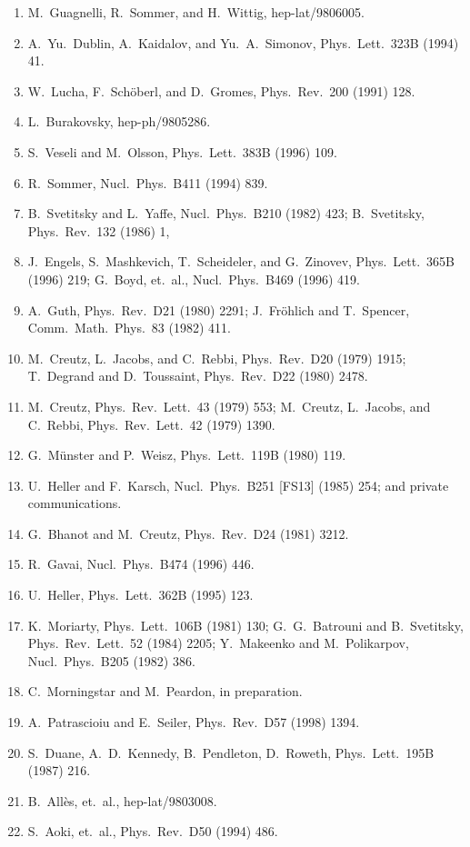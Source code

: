 \begin{enumerate}
\item M.~Guagnelli, R.~Sommer, and H.~Wittig, hep-lat/9806005.
\item A.~Yu.~Dublin, A.~Kaidalov, and Yu.~A.~Simonov, Phys.\ Lett.\ 323B (1994) 41.
\item W.~Lucha, F.~Sch\"oberl, and D.~Gromes, Phys.\ Rev.\ 200 (1991) 128.
\item L.~Burakovsky, hep-ph/9805286.
\item S.~Veseli and M.~Olsson, Phys.\ Lett.\ 383B (1996) 109.
\item R.~Sommer, Nucl.\ Phys.\ B411 (1994) 839.
\item B.~Svetitsky and L.~Yaffe, Nucl.\ Phys.\ B210 (1982) 423; B.~Svetitsky, Phys.\ Rev.\ 132 (1986) 1,
\item J.~Engels, S.~Mashkevich, T.~Scheideler, and G.~Zinovev, Phys.\ Lett.\ 365B (1996) 219; G.~Boyd, et.\ al., Nucl.\ Phys.\ B469 (1996) 419.
\item A.~Guth, Phys.\ Rev.\ D21 (1980) 2291; J.~Fr\"ohlich and T.~Spencer, Comm.\ Math.\ Phys.\ 83 (1982) 411.
\item M.~Creutz, L.~Jacobs, and C.~Rebbi, Phys.\ Rev.\ D20 (1979) 1915; T.~Degrand and D.~Toussaint, Phys.\ Rev.\ D22 (1980) 2478.
\item M.~Creutz, Phys.\ Rev.\ Lett.\ 43 (1979) 553; M.~Creutz, L.~Jacobs, and C.~Rebbi, Phys.\ Rev.\ Lett.\ 42 (1979) 1390.
\item G.~M\"unster and P.~Weisz, Phys.\ Lett.\ 119B (1980) 119.
\item U.~Heller and F.~Karsch, Nucl.\ Phys.\ B251 [FS13] (1985) 254; and private communications.
\item G.~Bhanot and M.~Creutz, Phys.\ Rev.\ D24 (1981) 3212.
\item R.~Gavai, Nucl.\ Phys.\ B474 (1996) 446.
\item U.~Heller, Phys.\ Lett.\ 362B (1995) 123.
\item K.~Moriarty, Phys.\ Lett.\ 106B (1981) 130; G.~G.~Batrouni and B.~Svetitsky, Phys.\ Rev.\ Lett.\ 52 (1984) 2205; Y.~Makeenko and M.~Polikarpov, Nucl.\ Phys.\ B205 (1982) 386.
\item C.~Morningstar and M.~Peardon, in preparation.
\item A.~Patrascioiu and E.~Seiler, Phys.\ Rev.\ D57 (1998) 1394.
\item S.~Duane, A.~D.~Kennedy, B.~Pendleton, D.~Roweth, Phys.\ Lett.\ 195B (1987) 216.
\item B.~All\`es, et.\ al., hep-lat/9803008.
\item S.~Aoki, et.\ al., Phys.\ Rev.\ D50 (1994) 486.

\end{enumerate}
